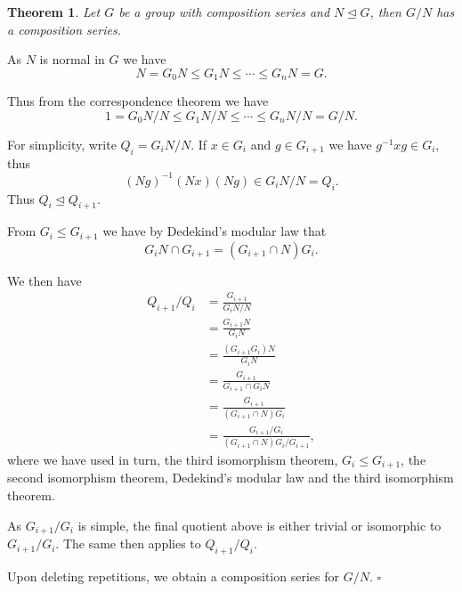 \documentclass[10pt]{article}
\newtheorem{theorem}{Theorem}[section]
\newenvironment{proof}[1][Proof]{\begin{trivlist}
\item[\hskip \labelsep {\itshape #1}]}{\end{trivlist}}
\begin{document}
\begin{theorem}
Let $G$ be a group with composition series and $N \mathrel{\unlhd} G$, then $G/N$ has a composition series.
\end{theorem}

\begin{proof}
As $N$ is normal in $G$ we have
$$N = G_0N \leq G_1N \leq \cdots \leq G_nN = G.$$

Thus from the correspondence theorem we have
$$1 = G_0N/N \leq G_1N/N \leq \cdots \leq G_nN/N = G/N.$$

For simplicity, write $Q_i = G_iN/N$. If $x \in G_i$ and $g \in G_{i+1}$ we have $g^{-1}xg \in G_i$, thus
$$(Ng)^{-1}(Nx)(Ng) \in G_iN/N = Q_i.$$
Thus $Q_i \mathrel{\unlhd} Q_{i+1}$.

From $G_i \leq G_{i+1}$ we have by Dedekind's modular law that
$$G_iN\cap G_{i+1} = (G_{i+1}\cap N)G_i.$$

We then have
\begin{align*}
Q_{i+1}/Q_i &= \frac{G_{i+1}}{G_iN/N}\\
&= \frac{G_{i+1}N}{G_iN}\\
&= \frac{(G_{i+1}G_i)N}{G_iN}\\
&= \frac{G_{i+1}}{G_{i+1}\cap G_iN}\\
&= \frac{G_{i+1}}{(G_{i+1}\cap N)G_i}\\
&= \frac{G_{i+1}/G_i}{(G_{i+1}\cap N)G_i/G_{i+1}},
\end{align*}
where we have used in turn, the third isomorphism theorem, $G_i \leq G_{i+1}$, the second isomorphism theorem, Dedekind's modular law and the third isomorphism theorem.

As $G_{i+1}/G_i$ is simple, the final quotient above is either trivial or isomorphic to $G_{i+1}/G_i$. The same then applies to $Q_{i+1}/Q_i$.

Upon deleting repetitions, we obtain a composition series for $G/N$. $\square$
\end{proof}

\end{document}
